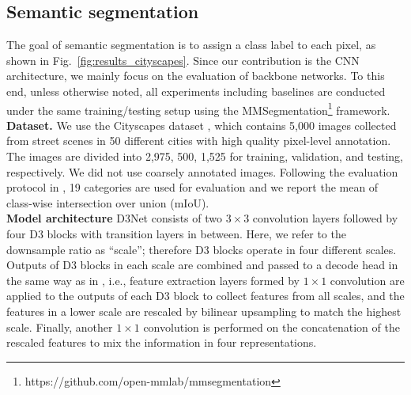 \documentclass[final]{cvpr}
\begin{document}
\subsection{Semantic segmentation}
The goal of semantic segmentation is to assign a class label to each pixel, as shown in Fig.~\ref{fig:results_cityscapes}. Since our contribution is the CNN architecture, we mainly focus on the evaluation of backbone networks. 
To this end, unless otherwise noted, all experiments including baselines are conducted under the same training/testing setup using the MMSegmentation\footnote{https://github.com/open-mmlab/mmsegmentation} framework.
\vspace{3mm}\\
\textbf{Dataset.} \hspace{1mm}
We use the Cityscapes dataset \cite{Cordts2016Cityscapes}, which contains 5,000 images collected from street scenes in 50 different cities with high quality pixel-level annotation.
The images are divided into 2,975, 500, 1,525 for training, validation, and testing, respectively. We did not use coarsely annotated images.
Following the evaluation protocol in \cite{Cordts2016Cityscapes}, 19 categories are used for evaluation and we report the mean of class-wise intersection over union (mIoU).
\vspace{3mm}\\
\textbf{Model architecture} \hspace{1mm}
D3Net consists of two $3\times3$ convolution layers followed by four D3 blocks with transition layers in between. Here, we refer to the downsample ratio as ``scale''; therefore D3 blocks operate in four different scales. Outputs of D3 blocks in each scale are combined and passed to a decode head in the same way as in \cite{Long15,WangSCJDZLMTWLX19}, i.e., feature extraction layers formed by $1\times1$ convolution are applied to the outputs of each D3 block to collect features from all scales, and the features in a lower scale are rescaled by bilinear upsampling to match the highest scale. Finally, another $1\times1$ convolution is performed on the concatenation of the rescaled features to mix the information in four representations.
\end{document}

